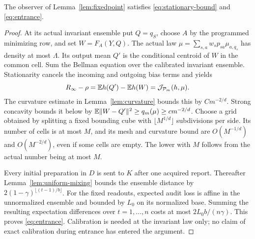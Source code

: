 \begin{proposition}\label{prop:invariant}
The observer of Lemma~\ref{lem:fixedpoint} satisfies
\eqref{eq:stationary-bound} and \eqref{eq:entrance}.
\end{proposition}
\begin{proof}
At its actual invariant ensemble put $Q=q_S$, choose $A$ by the programmed minimizing row, and set $W=F_A(Y,Q)$. The actual law
$\mu=\sum_{s,a}w_sp_{sa}\mu_{a,q_s}$ has density at most $\Lambda$. Its output mean $Q'$ is the conditional centroid of $W$ in the common cell. Sum the Bellman equation over the calibrated invariant ensemble. Stationarity cancels the incoming and outgoing bias terms and yields
\begin{equation}\label{eq:stationary-jensen}
 R_\infty-\rho=\mathbb E h(Q')-\mathbb E h(W)
       =\mathcal J_{\mathcal P_m}(h,\mu).
\end{equation}
The curvature estimate in Lemma~\ref{lem:curvature} bounds this by $Cm^{-2/d}$. Strong concavity bounds it below by
$\mathbb E\lVert W-Q'\rVert^2\ge q_m(\mu)\ge cm^{-2/d}$.
Choose a grid obtained by splitting a fixed bounding cube with
$\lfloor M^{1/d}\rfloor$ subdivisions per side. Its number of cells is at most $M$, and its mesh and curvature bound are $O(M^{-1/d})$ and $O(M^{-2/d})$, even if some cells are empty. The lower with $M$ follows from the actual number being at most $M$.

Every initial preparation in $D$ is sent to $K$ after one acquired report. Thereafter Lemma~\ref{lem:uniform-mixing} bounds the ensemble distance by
$2(1-\gamma)^{\lfloor(t-1)/b\rfloor}$. For the fixed readouts, expected audit loss is affine in the unnormalized ensemble and bounded by $L_0$ on its normalized base. Summing the resulting expectation differences over $t=1,\ldots,n$ costs at most $2L_0 b/(n\gamma)$. This proves \eqref{eq:entrance}. Calibration is needed at the invariant law only; no claim of exact calibration during entrance has entered the argument.
\end{proof}
